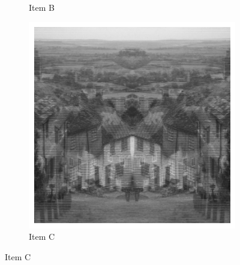 \documentclass[12pt,a4paper]{report}
\begin{document}
\begin{figure}[H]
\begin{subfigure}{0.3\textwidth}
    \caption{Item B}
  \end{subfigure}
  \begin{subfigure}{0.3\textwidth}
    \includegraphics[width=\linewidth]{imagens/ex8-c.png}
    \caption{Item C}
  \end{subfigure}


\end{figure}
\end{document}
